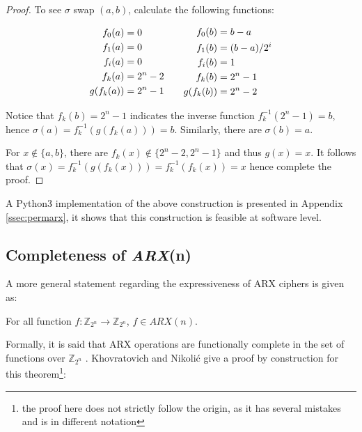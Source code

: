 \begin{proof}
To see $\sigma$ swap $(a,b)$, calculate the following functions:

\begin{equation*}
\setlength{\abovedisplayshortskip}{0em}
\setlength{\abovedisplayskip}{0em}
\begin{split}
f_0(a) &= 0\\
f_1(a) &= 0\\
f_i(a) &= 0\\
f_k(a) &= 2^n-2\\
g(f_k(a)) &= 2^n-1\\
\end{split}
\quad\quad
\begin{split}
f_0(b) &= b-a\\
f_1(b) &= (b-a)/2^i\\
f_i(b) &= 1\\
f_k(b) &= 2^n-1\\
g(f_k(b)) &= 2^n-2\\
\end{split}
\end{equation*}

\noindent Notice that $f_k(b)=2^n-1$ indicates the inverse function $f_k^{-1}(2^n-1)=b$,
hence $\sigma(a)=f_k^{-1}(g(f_k(a)))=b$. Similarly, there are $\sigma(b)=a$.

For $x\notin\{a,b\}$, there are $f_k(x)\notin\{2^n-2,2^n-1\}$ and thus $g(x)=x$. It
follows that $\sigma(x)=f_k^{-1}(g(f_k(x)))=f_k^{-1}(f_k(x))=x$ hence complete the proof.
\end{proof}

A Python3 implementation of the above construction is presented in Appendix
\ref{ssec:permarx}, it shows that this construction is feasible at software level.

\subsection{Completeness of \textbf{\textit{ARX}(n)}}

A more general statement regarding the expressiveness of ARX ciphers is given as:

\begin{theorem}
\label{thm:func}
For all function $f:\mathbb{Z}_{2^n}\rightarrow\mathbb{Z}_{2^n}$, $f\in\textit{ARX}(n)$.
\end{theorem}

Formally, it is said that ARX operations are functionally complete in the set of
functions over $\mathbb{Z}_{2^n}$ \cite{khovratovich2010rotational}. Khovratovich and
Nikoli{\'c} give a proof by construction for this theorem\footnote{the proof here does
not strictly follow the origin, as it has several mistakes and is in different notation}:

